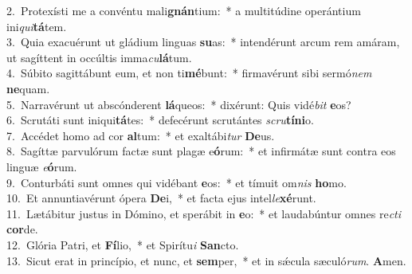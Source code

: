 {2.~}Protexísti me a convéntu mali\textbf{gnán}tium:~* a multitúdine operántium ini\textit{qui}\textbf{tá}tem.\\
{3.~}Quia exacuérunt ut gládium linguas \textbf{su}as:~* intendérunt arcum rem amáram, ut sagíttent in occúltis imma\textit{cu}\textbf{lá}tum.\\
{4.~}Súbito sagittábunt eum, et non ti\textbf{mé}bunt:~* firmavérunt sibi sermó\textit{nem} \textbf{ne}quam.\\
{5.~}Narravérunt ut abscónderent \textbf{lá}queos:~* dixérunt: Quis vidé\textit{bit} \textbf{e}os?\\
{6.~}Scrutáti sunt iniqui\textbf{tá}tes:~* defecérunt scrutántes \textit{scru}\textbf{tí}\textbf{ni}o.\\
{7.~}Accédet homo ad cor \textbf{al}tum:~* et exaltábi\textit{tur} \textbf{De}us.\\
{8.~}Sagíttæ parvulórum factæ sunt plagæ e\textbf{ó}rum:~* et infirmátæ sunt contra eos linguæ \textit{e}\textbf{ó}rum.\\
{9.~}Conturbáti sunt omnes qui vidébant \textbf{e}os:~* et tímuit om\textit{nis} \textbf{ho}mo.\\
{10.~}Et annuntiavérunt ópera \textbf{De}i,~* et facta ejus intel\textit{le}\textbf{xé}runt.\\
{11.~}Lætábitur justus in Dómino, et sperábit in \textbf{e}o:~* et laudabúntur omnes re\textit{cti} \textbf{cor}de.\\
{12.~}Glória Patri, et \textbf{Fí}lio,~* et Spirítu\textit{i} \textbf{San}cto.\\
{13.~}Sicut erat in princípio, et nunc, et \textbf{sem}per,~* et in sǽcula sæculó\textit{rum}. \textbf{A}men.\\
